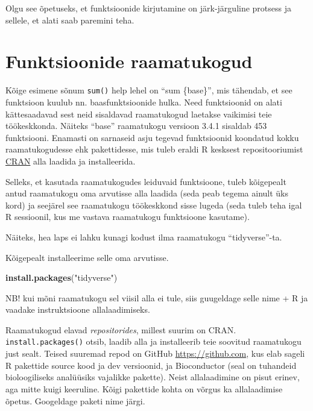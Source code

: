 \documentclass[]{book}
\newenvironment{Shaded}{\begin{snugshade}}{\end{snugshade}}
\newcommand{\KeywordTok}[1]{\textcolor[rgb]{0.13,0.29,0.53}{\textbf{#1}}}
\newcommand{\StringTok}[1]{\textcolor[rgb]{0.31,0.60,0.02}{#1}}
\newcommand{\NormalTok}[1]{#1}
\begin{document}
Olgu see õpetuseks, et funktsioonide kirjutamine on järk-järguline
protsess ja sellele, et alati saab paremini teha.

\section{Funktsioonide raamatukogud}\label{funktsioonide-raamatukogud}

Kõige esimene sõnum \texttt{sum()} help lehel on ``sum \{base\}'', mis
tähendab, et see funktsioon kuulub nn. baasfunktsioonide hulka. Need
funktsioonid on alati kättesaadavad sest neid sisaldavad raamatukogud
laetakse vaikimisi teie töökeskkonda. Näiteks ``base'' raamatukogu
versioon 3.4.1 sisaldab 453 funktsiooni. Enamasti on sarnaseid asju
tegevad funktsioonid koondatud kokku raamatukogudesse ehk pakettidesse,
mis tuleb eraldi R kesksest repositooriumist
\href{https://cran.r-project.org}{CRAN} alla laadida ja installeerida.

Selleks, et kasutada raamatukogudes leiduvaid funktsioone, tuleb
kõigepealt antud raamatukogu oma arvutisse alla laadida (seda peab
tegema ainult üks kord) ja seejärel see raamatukogu töökeskkond sisse
lugeda (seda tuleb teha igal R sessioonil, kus me vastava raamatukogu
funktsioone kasutame).

Näiteks, hea laps ei lahku kunagi kodust ilma raamatukogu
``tidyverse''-ta.

Kõigepealt installeerime selle oma arvutisse.

\begin{Shaded}
\begin{Highlighting}[]
\KeywordTok{install.packages}\NormalTok{(}\StringTok{"tidyverse"}\NormalTok{)}
\end{Highlighting}
\end{Shaded}

NB! kui mõni raamatukogu sel viisil alla ei tule, siis guugeldage selle
nime + R ja vaadake instruktsioone allalaadimiseks.

Raamatukogud elavad \emph{repositorides}, millest suurim on CRAN.
\texttt{install.packages()} otsib, laadib alla ja installeerib teie
soovitud raamatukogu just sealt. Teised suuremad repod on GitHub
\url{https://github.com}, kus elab sageli R pakettide source kood ja dev
versioonid, ja Bioconductor (seal on tuhandeid bioloogiliseks analüüsiks
vajalikke pakette). Neist allalaadimine on pisut erinev, aga mitte kuigi
keeruline. Kõigi pakettide kohta on võrgus ka allalaadimise õpetus.
Googeldage paketi nime järgi.
\end{document}
